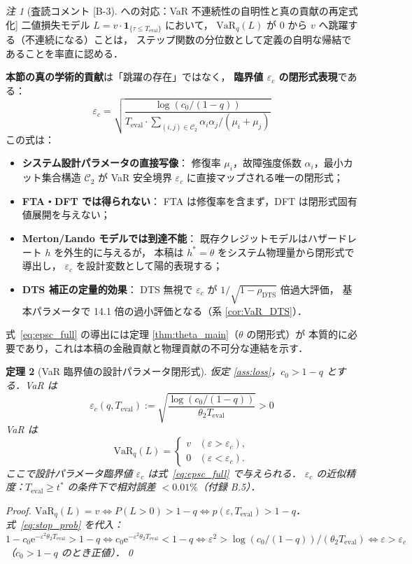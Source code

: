 \documentclass[12pt,a4paper]{article}
\theoremstyle{plain}
\newtheorem{theorem}{定理}[section]
\theoremstyle{definition}
\theoremstyle{remark}
\newtheorem{remark}[theorem]{注}
\newcommand{\eps}{\varepsilon}
\newcommand{\e}{\mathrm{e}}
\newcommand{\VaR}{\mathrm{VaR}}
\newcommand{\calCtwo}{\mathcal{C}_2}
\newcommand{\rhoDTS}{\rho_{\mathrm{DTS}}}
\newcommand{\Teval}{T_{\mathrm{eval}}}
\begin{document}
\begin{remark}[査読コメント [B-3] への対応：VaR 不連続性の自明性と真の貢献の再定式化]
  二値損失モデル $L=v\cdot\mathbf{1}_{\{\tau\le\Teval\}}$ において，
  $\VaR_q(L)$ が $0$ から $v$ へ跳躍する（不連続になる）ことは，
  ステップ関数の分位数として定義の自明な帰結であることを率直に認める．

  \textbf{本節の真の学術的貢献}は「跳躍の存在」ではなく，
  \textbf{臨界値 $\eps_c$ の閉形式表現}である：
  \begin{equation}\label{eq:epsc_full}
    \eps_c = \sqrt{\frac{\log(c_0/(1-q))}{\Teval\cdot\sum_{(i,j)\in\calCtwo}\alpha_i\alpha_j/(\mu_i+\mu_j)}}
  \end{equation}
  この式は：
  \begin{itemize}
    \item \textbf{システム設計パラメータの直接写像}：
      修復率 $\mu_i$，故障強度係数 $\alpha_i$，最小カット集合構造 $\calCtwo$ が
      VaR 安全境界 $\eps_c$ に直接マップされる唯一の閉形式；
    \item \textbf{FTA・DFT では得られない}：
      FTA は修復率を含まず，DFT は閉形式固有値展開を与えない；
    \item \textbf{Merton/Lando モデルでは到達不能}：
      既存クレジットモデルはハザードレート $h$ を外生的に与えるが，
      本稿は $h^*=\theta$ をシステム物理量から閉形式で導出し，
      $\eps_c$ を設計変数として陽的表現する；
    \item \textbf{DTS 補正の定量的効果}：
      DTS 無視で $\eps_c$ が $1/\sqrt{1-\rhoDTS}$ 倍過大評価，
      基本パラメータで 14.1 倍の過小評価となる（系 \ref{cor:VaR_DTS}）．
  \end{itemize}
  式~\eqref{eq:epsc_full} の導出には定理 \ref{thm:theta_main}（$\theta$ の閉形式）が
  本質的に必要であり，これは本稿の金融貢献と物理貢献の不可分な連結を示す．
\end{remark}

\begin{theorem}[VaR 臨界値の設計パラメータ閉形式]\label{thm:VaR}
  仮定 \ref{ass:loss}，$c_0>1-q$ とする．VaR は
  \begin{equation}\label{eq:eps_c}
    \eps_c(q,\Teval)
    := \sqrt{\frac{\log(c_0/(1-q))}{\theta_2\Teval}} > 0
  \end{equation}
  VaR は
  \begin{equation}\label{eq:VaR_jump}
    \VaR_q(L) = \begin{cases}
      v & (\eps>\eps_c), \\
      0 & (\eps<\eps_c).
    \end{cases}
  \end{equation}
  ここで設計パラメータ臨界値 $\eps_c$ は式~\eqref{eq:epsc_full} で与えられる．
  $\eps_c$ の近似精度：$\Teval\ge t^*$ の条件下で相対誤差 $<0.01\%$（付録 B.5）．

  \begin{proof}
    $\VaR_q(L)=v \iff P(L>0)>1-q \iff p(\eps,\Teval)>1-q$．
    式~\eqref{eq:stop_prob} を代入：
    $1-c_0\e^{-\eps^2\theta_2\Teval}>1-q
    \iff c_0\e^{-\eps^2\theta_2\Teval}<1-q
    \iff \eps^2>\log(c_0/(1-q))/(\theta_2\Teval)
    \iff \eps>\eps_c$（$c_0>1-q$ のとき正値）．\qed
  \end{proof}
\end{theorem}
\end{document}
